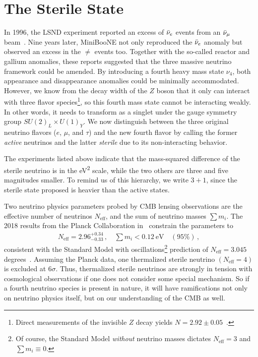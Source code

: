 \section{The Sterile State}\label{sec:anomalies}
In 1996, the LSND experiment reported an excess of $\bar{\nu}_e$ events from an $\bar{\nu}_\mu$ beam~\cite{lsnd}.  
Nine years later, MiniBooNE not only reproduced the $\bar{\nu}_e$ anomaly but observed an excess in the
$\ne$ events too. Together with the so-called reactor and gallium anomalies, these reports suggested 
that the three massive neutrino framework could be amended.
By introducing a fourth heavy mass state $\nu_4$, both appearance and disappearance anomalies could be minimally accommodated.
However, we know from the decay width of the $Z$ boson that it only can interact with three flavor species\footnote{
    Direct measurements of the invisible $Z$ decay yields $N=2.92 \pm 0.05$~\cite{pdg}.
}, 
so this fourth mass state cannot be interacting weakly. In other words, it needs to transform as a
singlet under the gauge symmetry group $SU(2)_L \times U(1)_{Y}$.
We now distinguish between the three original neutrino flavors ($e$, $\mu$, and $\tau$) and the new fourth 
flavor by calling the former \emph{active} neutrinos
and the latter \emph{sterile} due to its non-interacting behavior.

The experiments listed above indicate that the mass-squared difference of the 
sterile neutrino is in the \si{\eV\squared} scale, while the two others
are three and five magnitudes smaller. To remind us of this hierarchy, we write $3+1$, since the sterile state 
proposed is heavier than the active states.


Two neutrino physics parameters probed by CMB lensing observations are the effective number of neutrinos
$N_\text{eff}$, and the sum of neutrino masses $\sum m_i$. 
The 2018 results from the Planck Collaboration in~\cite{planck2018} constrain the parameters to 
\begin{align}
    N_\text{eff} = 2.96^{+0.34}_{-0.33}\,, \quad \sum m_i < \SI{0.12}{\eV} \quad (95\%)\,,
\end{align}
consistent with the Standard Model with oscillations\footnote{Of course, the 
Standard Model \emph{without} neutrino masses dictates $N_\text{eff} = 3$ and $\sum m_i \equiv 0$.} prediction of $N_\text{eff} = 3.045$ degrees~\cite{desalas2016}.
Assuming the Planck data, one thermalized sterile neutrino $(N_\text{eff} = 4)$ is excluded at $6\sigma$. 
Thus, thermalized sterile 
neutrinos are strongly in tension with cosmological observations if one does not consider some special mechanism.
So if a fourth neutrino species is present in nature, it will have ramifications not only on neutrino physics itself, but on
our understanding of the CMB as well.


